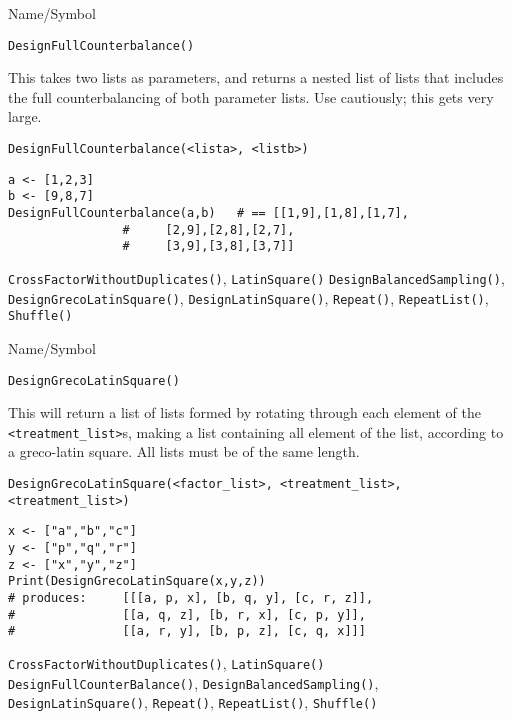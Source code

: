 \rl




\begin{desc}{Name/Symbol}

\item[Name/Symbol]	\verb+DesignFullCounterbalance()+

\item[Description]	This takes two lists as parameters, and returns a nested list 
		of lists that includes the full counterbalancing of both 
		parameter lists.  Use cautiously; this gets very large.

\item[Usage]
\begin{verbatim}
DesignFullCounterbalance(<lista>, <listb>)
\end{verbatim}

\item[Example]
\begin{verbatim}
a <- [1,2,3]
b <- [9,8,7]
DesignFullCounterbalance(a,b)	# == [[1,9],[1,8],[1,7],
				#     [2,9],[2,8],[2,7],
				#     [3,9],[3,8],[3,7]]
\end{verbatim}

\item[See Also] \verb+CrossFactorWithoutDuplicates()+, \verb+LatinSquare()+
  \verb+DesignBalancedSampling()+, \verb+DesignGrecoLatinSquare()+, 
  \verb+DesignLatinSquare()+, \verb+Repeat()+, \verb+RepeatList()+,
  \verb+Shuffle()+
\end{desc}

\rl




\begin{desc}{Name/Symbol}
\item[Name/Symbol]	\verb+DesignGrecoLatinSquare()+

\item[Description] This will return a list of lists formed by rotating
  through each element of the \verb+<treatment_list>+s, making a list
  containing all element of the list, according to a greco-latin
  square.  All lists must be of the same length.

\item[Usage]
\begin{verbatim}
DesignGrecoLatinSquare(<factor_list>, <treatment_list>, 
<treatment_list>)
\end{verbatim}

\item[Example]
\begin{verbatim}
x <- ["a","b","c"]
y <- ["p","q","r"]
z <- ["x","y","z"]
Print(DesignGrecoLatinSquare(x,y,z))
# produces:   	[[[a, p, x], [b, q, y], [c, r, z]], 
#               [[a, q, z], [b, r, x], [c, p, y]], 
#               [[a, r, y], [b, p, z], [c, q, x]]]
\end{verbatim}

\item[See Also] \verb+CrossFactorWithoutDuplicates()+, \verb+LatinSquare()+
  \verb+DesignFullCounterBalance()+, \verb+DesignBalancedSampling()+,
  \verb+DesignLatinSquare()+, \verb+Repeat()+, \verb+RepeatList()+,
  \verb+Shuffle()+
\end{desc}

